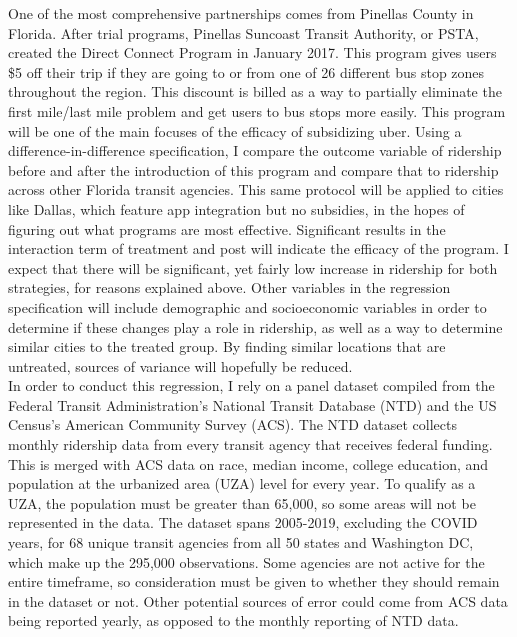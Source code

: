 \documentclass [11pt]{article}
\begin{document}
\indent One of the most comprehensive partnerships comes from Pinellas County in Florida. After trial programs, Pinellas Suncoast Transit Authority, or PSTA, created the Direct Connect Program in January 2017. This program gives users \$5 off their trip if they are going to or from one of 26 different bus stop zones throughout the region. This discount is billed as a way to partially eliminate the first mile/last mile problem and get users to bus stops more easily. This program will be one of the main focuses of the efficacy of subsidizing uber. Using a difference-in-difference specification, I compare the outcome variable of ridership before and after the introduction of this program and compare that to ridership across other Florida transit agencies. This same protocol will be applied to cities like Dallas, which feature app integration but no subsidies, in the hopes of figuring out what programs are most effective. Significant results in the interaction term of treatment and post will indicate the efficacy of the program. I expect that there will be significant, yet fairly low increase in ridership for both strategies, for reasons explained above. Other variables in the regression specification will include demographic and socioeconomic variables in order to determine if these changes play a role in ridership, as well as a way to determine similar cities to the treated group. By finding similar locations that are untreated, sources of variance will hopefully be reduced.\\
\indent In order to conduct this regression, I rely on a panel dataset compiled from the Federal Transit Administration's National Transit Database (NTD) and the US Census's American Community Survey (ACS). The NTD dataset collects monthly ridership data from every transit agency that receives federal funding. This is merged with ACS data on race, median income, college education, and population at the urbanized area (UZA) level for every year. To qualify as a UZA, the population must be greater than 65,000, so some areas will not be represented in the data. The dataset spans 2005-2019, excluding the COVID years, for 68 unique transit agencies from all 50 states and Washington DC, which make up the 295,000 observations. Some agencies are not active for the entire timeframe, so consideration must be given to whether they should remain in the dataset or not. Other potential sources of error could come from ACS data being reported yearly, as opposed to the monthly reporting of NTD data.\\
\end{document}
